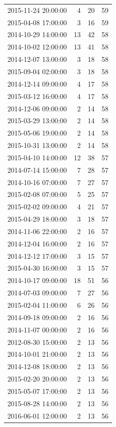 \begin{tabular}{lrrr}
2015-11-24 20:00:00 & 4 & 20 & 59 \\
2015-04-08 17:00:00 & 3 & 16 & 59 \\
2014-10-29 14:00:00 & 13 & 42 & 58 \\
2014-10-02 12:00:00 & 13 & 41 & 58 \\
2014-12-07 13:00:00 & 3 & 18 & 58 \\
2015-09-04 02:00:00 & 3 & 18 & 58 \\
2014-12-14 09:00:00 & 4 & 17 & 58 \\
2015-03-12 16:00:00 & 4 & 17 & 58 \\
2014-12-06 09:00:00 & 2 & 14 & 58 \\
2015-03-29 13:00:00 & 2 & 14 & 58 \\
2015-05-06 19:00:00 & 2 & 14 & 58 \\
2015-10-31 13:00:00 & 2 & 14 & 58 \\
2015-04-10 14:00:00 & 12 & 38 & 57 \\
2014-07-14 15:00:00 & 7 & 28 & 57 \\
2014-10-16 07:00:00 & 7 & 27 & 57 \\
2015-02-08 07:00:00 & 5 & 25 & 57 \\
2015-02-02 09:00:00 & 4 & 21 & 57 \\
2015-04-29 18:00:00 & 3 & 18 & 57 \\
2014-11-06 22:00:00 & 2 & 16 & 57 \\
2014-12-04 16:00:00 & 2 & 16 & 57 \\
2014-12-12 17:00:00 & 3 & 15 & 57 \\
2015-04-30 16:00:00 & 3 & 15 & 57 \\
2014-10-17 09:00:00 & 18 & 51 & 56 \\
2014-07-03 09:00:00 & 7 & 27 & 56 \\
2015-02-04 11:00:00 & 6 & 26 & 56 \\
2014-09-18 09:00:00 & 2 & 16 & 56 \\
2014-11-07 00:00:00 & 2 & 16 & 56 \\
2012-08-30 15:00:00 & 2 & 13 & 56 \\
2014-10-01 21:00:00 & 2 & 13 & 56 \\
2014-12-08 18:00:00 & 2 & 13 & 56 \\
2015-02-20 20:00:00 & 2 & 13 & 56 \\
2015-05-07 17:00:00 & 2 & 13 & 56 \\
2015-08-28 14:00:00 & 2 & 13 & 56 \\
2016-06-01 12:00:00 & 2 & 13 & 56 \\

\end{tabular}
